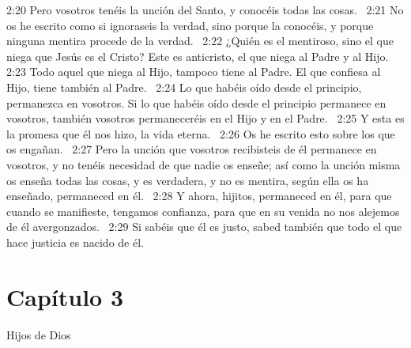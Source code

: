 2:20 Pero vosotros tenéis la unción del Santo, y conocéis todas las cosas.  
2:21 No os he escrito como si ignoraseis la verdad, sino porque la conocéis, y porque ninguna mentira procede de la verdad.  
2:22 ¿Quién es el mentiroso, sino el que niega que Jesús es el Cristo? Este es anticristo, el que niega al Padre y al Hijo.  
2:23 Todo aquel que niega al Hijo, tampoco tiene al Padre. El que confiesa al Hijo, tiene también al Padre.  
2:24 Lo que habéis oído desde el principio, permanezca en vosotros. Si lo que habéis oído desde el principio permanece en vosotros, también vosotros permaneceréis en el Hijo y en el Padre.  
2:25 Y esta es la promesa que él nos hizo, la vida eterna.  
2:26 Os he escrito esto sobre los que os engañan.  
2:27 Pero la unción que vosotros recibisteis de él permanece en vosotros, y no tenéis necesidad de que nadie os enseñe; así como la unción misma os enseña todas las cosas, y es verdadera, y no es mentira, según ella os ha enseñado, permaneced en él.  
2:28 Y ahora, hijitos, permaneced en él, para que cuando se manifieste, tengamos confianza, para que en su venida no nos alejemos de él avergonzados.  
2:29 Si sabéis que él es justo, sabed también que todo el que hace justicia es nacido de él.  
\section*{Capítulo 3 }
Hijos de Dios  

